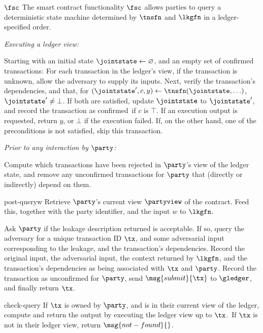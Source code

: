 \begin{functionalitysketch}{$\fsc$}
  The smart contract functionality $\fsc$ allows parties to query a
  deterministic state machine determined by $\tnsfn$ and $\lkgfn$ in a
  ledger-specified order.

  \vspace{1em}\noindent\emph{Executing a ledger view:}

  Starting with an initial state $\jointstate \gets \varnothing$,
  and an empty set of confirmed transactions: For each transaction
  in the ledger's view, if the transaction is unknown, allow the adversary to supply its inputs.
  Next, verify the transaction's dependencies, and that, for $(\jointstate', c, y) \gets
  \tnsfn(\jointstate, \ldots)$, $\jointstate' \neq \bot$. If both are satisfied, update
  $\jointstate$ to $\jointstate'$, and record the transaction as confirmed\ if
  $c$ is $\top$. If an
  execution output is requested, return $y$, or $\bot$ if the execution failed. If, on the other hand, one of the
  preconditions is not satisfied, skip this transaction.

  \vspace{1em}\noindent\emph{Prior to any interaction by $\party$:}

  Compute which transactions have been rejected in $\party$'s view of the ledger
  state, and remove any unconfirmed transactions for $\party$ that (directly
  or indirectly) depend on them.

  \begin{receivesketch}[honest]{post-query}{w}
    Retrieve $\party$'s current view $\partyview$ of the contract. Feed this,
    together with the party identifier, and the input $w$ to $\lkgfn$.

    Ask $\party$ if the leakage description returned is acceptable. If so, query
    the adversary for a unique transaction ID $\tx$, and some adversarial input
    corresponding to the leakage, and the transaction's dependencies. Record the
    original input, the adversarial input, the context returned by $\lkgfn$, and
    the transaction's dependencies as being associated with $\tx$ and $\party$.
    Record the transaction as unconfirmed for $\party$, send
    $\msg{submit}{\tx}$ to $\gledger$, and finally return $\tx$.
  \end{receivesketch}

  \begin{receivesketch}[honest]{check-query}{\tx}
    If $\tx$ is owned by $\party$, and is in their current view of the ledger,
    compute and return the output by executing the ledger view up to $\tx$.\ If
    $\tx$ is not in their ledger view, return $\msg{not-found}{}$.
  \end{receivesketch}
\end{functionalitysketch}


